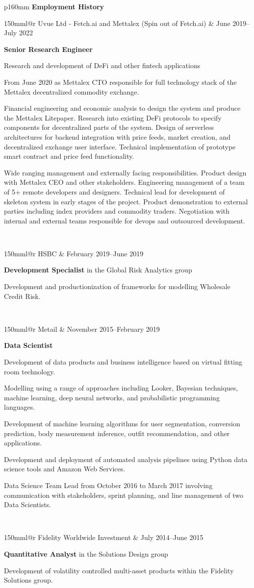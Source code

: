 \documentclass[10pt,a4paper]{article}
\makeatletter
\newcommand{\role}[6]{
\begin{tabular*}{150mm}{l@{\extracolsep{\fill}}r}
#5 & #1--#2 \\ 
\multicolumn{2}{p{145mm}}
{\textbf{#3}#4

{\small #6}} 
\end{tabular*}
\vspace{2mm}
 }
\makeatother
\begin{document}
\begin{tabular}{p{160mm}}
  {\large \textbf{Employment History}}\\
  \hline
  \role{June 2019}{July 2022}{Senior Research Engineer}{}{Uvue Ltd - Fetch.ai and Mettalex (Spin out of Fetch.ai)}
  {Research and development of DeFi and other fintech applications

  \footnotesize{From June 2020 as Mettalex CTO responsible for full technology stack of the Mettalex decentralized commodity exchange.

  Financial engineering and economic analysis to design the system and produce the Mettalex Litepaper.  Research into existing DeFi
  protocols to specify components for decentralized parts of the system.
  Design of serverless architectures for backend integration with price feeds, market creation, and decentralized exchange
  user interface.  Technical implementation of prototype smart contract and price feed functionality.}

  \footnotesize{Wide ranging management and externally facing responsibilities.  Product design with Mettalex CEO
  and other stakeholders.  Engineering management of a team of 5+ remote developers and designers.
  Technical lead for development of skeleton
  system in early stages of the project.  Product demonstration to external parties including index providers and
  commodity traders.  Negotiation with internal and external teams responsible for devops and outsourced development.}
  }\\
  \role{February 2019}{June 2019}{Development Specialist}{ in the Global Risk Analytics group}{HSBC}
  {Development and productionization of frameworks for modelling Wholesale Credit Risk.
  }\\
  \role{November 2015}{February 2019}{Data Scientist}{}{Metail} 
  {Development of data products and business intelligence based on virtual fitting room technology.

   \footnotesize{Modelling using a range of approaches including Looker, Bayesian techniques,
   machine learning, deep neural networks, and probabilistic programming languages.

  Development of machine learning algorithms for user segmentation,
   conversion prediction, body measurement inference, outfit recommendation, and other applications.

   Development and deployment of automated analysis pipelines using Python data science tools
   and Amazon Web Services.

   Data Science Team Lead from October 2016 to
   March 2017 involving communication with stakeholders, sprint planning, 
   and line management of two Data Scientists.}
  }\\
  \role{July 2014}{June 2015}{Quantitative Analyst}{ in the Solutions Design
  group}{Fidelity Worldwide Investment}
  {Development of volatility controlled multi-asset products 
  within the Fidelity Solutions group.

}
\end{tabular}
\end{document}
